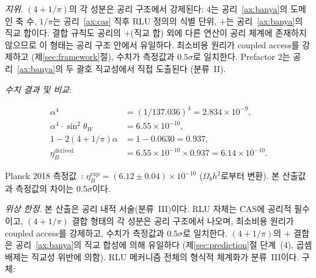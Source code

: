 \documentclass[entropy,article,submit,pdftex,oneauthor]{Definitions/mdpi}
\begin{document}
\emph{지위}. $(4+1/\pi)$의 각 성분은 공리 구조에서 강제된다: $4$는 공리~\ref{ax:banya}의 도메인 축 수, $1/\pi$는 공리~\ref{ax:cas} 직후 RLU 정의의 식별 단위, $+$는 공리~\ref{ax:banya}의 직교 합이다. 결합 규칙도 공리의 $+$(직교 합) 외에 다른 연산이 공리 체계에 존재하지 않으므로 이 형태는 공리 구조 안에서 유일하다. 최소비용 원리가 coupled access를 강제하고 (제\ref{sec:framework}절), 수치가 측정값과 $0.5\sigma$로 일치한다. Prefactor 2는 공리~\ref{ax:banya}의 두 괄호 직교성에서 직접 도출된다 (분류~II).

\emph{수치 결과 및 비교}:
\begin{linenomath}
\begin{align}
\alpha^4 &= (1/137.036)^4 = 2.834 \times 10^{-9}, \nonumber \\
\alpha^4 \cdot \sin^2\theta_W &= 6.55 \times 10^{-10}, \nonumber \\
1 - 2(4+1/\pi)\alpha &= 1 - 0.0630 = 0.937, \nonumber \\
\eta_B^{\text{derived}} &= 6.55 \times 10^{-10} \times 0.937 = 6.14 \times 10^{-10}.
\end{align}
\end{linenomath}

Planck 2018 측정값~\cite{pdg2024}: $\eta_B^{\text{exp}} = (6.12 \pm 0.04) \times 10^{-10}$ ($\Omega_b h^2$로부터 변환). 본 산출값과 측정값의 차이는 $0.5\sigma$이다.

\textit{위상 한정}. 본 산출은 공리 내적 서술(분류~III)이다. RLU 자체는 CAS에 공리적 필수이고, $(4+1/\pi)$ 결합 형태의 각 성분은 공리 구조에서 나오며, 최소비용 원리가 coupled access를 강제하고, 수치가 측정값과 $0.5\sigma$로 일치한다. $(4+1/\pi)$의 $+$ 결합은 공리~\ref{ax:banya}의 직교 합성에 의해 유일하다 (제\ref{sec:prediction}절 단계~(4), 곱셈 배제는 직교성 위반에 의함). RLU 메커니즘 전체의 형식적 체계화가 분류~III이다. 구체:
\end{document}
